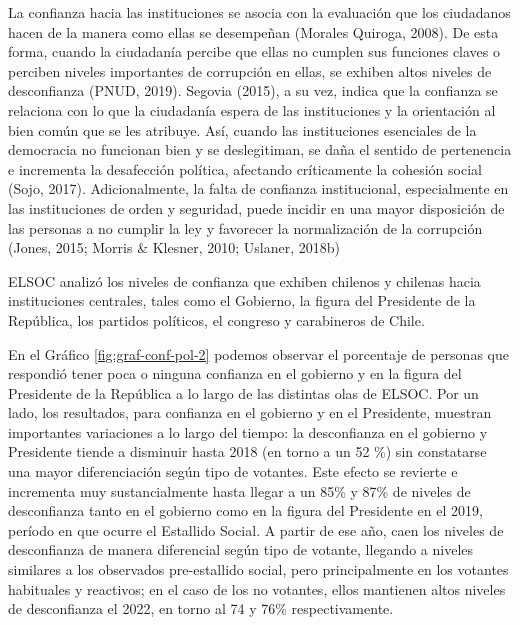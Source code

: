 \documentclass[
  12pt,
]{book}
\begin{document}
La confianza hacia las instituciones se asocia con la evaluación que los ciudadanos hacen de la manera como ellas se desempeñan (Morales Quiroga, 2008). De esta forma, cuando la ciudadanía percibe que ellas no cumplen sus funciones claves o perciben niveles importantes de corrupción en ellas, se exhiben altos niveles de desconfianza (PNUD, 2019). Segovia (2015), a su vez, indica que la confianza se relaciona con lo que la ciudadanía espera de las instituciones y la orientación al bien común que se les atribuye. Así, cuando las instituciones esenciales de la democracia no funcionan bien y se deslegitiman, se daña el sentido de pertenencia e incrementa la desafección política, afectando críticamente la cohesión social (Sojo, 2017). Adicionalmente, la falta de confianza institucional, especialmente en las instituciones de orden y seguridad, puede incidir en una mayor disposición de las personas a no cumplir la ley y favorecer la normalización de la corrupción (Jones, 2015; Morris \& Klesner, 2010; Uslaner, 2018b)

ELSOC analizó los niveles de confianza que exhiben chilenos y chilenas hacia instituciones centrales, tales como el Gobierno, la figura del Presidente de la República, los partidos políticos, el congreso y carabineros de Chile.

En el Gráfico \ref{fig:graf-conf-pol-2} podemos observar el porcentaje de personas que respondió tener poca o ninguna confianza en el gobierno y en la figura del Presidente de la República a lo largo de las distintas olas de ELSOC. Por un lado, los resultados, para confianza en el gobierno y en el Presidente, muestran importantes variaciones a lo largo del tiempo: la desconfianza en el gobierno y Presidente tiende a disminuir hasta 2018 (en torno a un 52 \%) sin constatarse una mayor diferenciación según tipo de votantes. Este efecto se revierte e incrementa muy sustancialmente hasta llegar a un 85\% y 87\% de niveles de desconfianza tanto en el gobierno como en la figura del Presidente en el 2019, período en que ocurre el Estallido Social. A partir de ese año, caen los niveles de desconfianza de manera diferencial según tipo de votante, llegando a niveles similares a los observados pre-estallido social, pero principalmente en los votantes habituales y reactivos; en el caso de los no votantes, ellos mantienen altos niveles de desconfianza el 2022, en torno al 74 y 76\% respectivamente.
\end{document}
